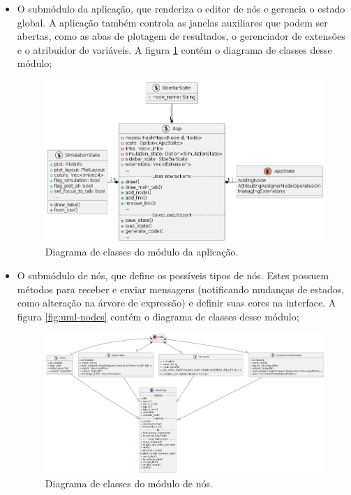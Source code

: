 \documentclass[
	12pt,				%
	openright,			%
	oneside,			%
	a4paper,			%
	main=brazil,
	english,			%
	]{ufsj-abntex2}
\begin{document}
\begin{itemize}
    \item O submódulo da aplicação, que renderiza o editor de nós e gerencia o estado global. A aplicação também controla as janelas auxiliares que podem ser abertas, como as abas de plotagem de resultados, o gerenciador de extensões e o atribuidor de variáveis. A figura \ref{fig:uml-app} contém o diagrama de classes desse módulo;
    \begin{figure}[h]
        \centering
        \includegraphics[scale=0.5]{diagrams/img/app.png} 
        \caption{Diagrama de classes do módulo da aplicação.}
        \label{fig:uml-app}
    \end{figure}
    \item O submódulo de nós, que define os possíveis tipos de nós. Estes possuem métodos para receber e enviar mensagens (notificando mudanças de estados, como alteração na árvore de expressão) e definir suas cores na interface. A figura \ref{fig:uml-nodes} contém o diagrama de classes desse módulo;
    \begin{figure}[h]
        \centering
        \includegraphics[scale=0.3]{diagrams/img/nodes.png} 
        \caption{Diagrama de classes do módulo de nós.}

\end{figure}
\end{itemize}
\end{document}
